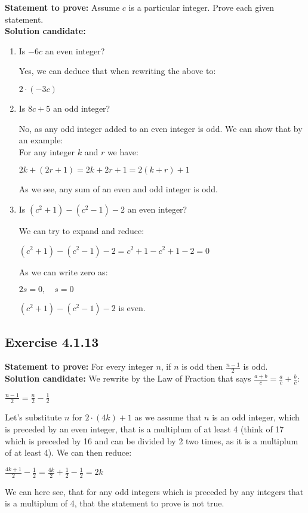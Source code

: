 \documentclass{report}
\newcommand{\cent}[1]{\begin{center}#1\end{center}}
\newcommand{\Prove}{\textbf{Statement to prove: }}
\newcommand{\solution}{\textbf{Solution candidate: }}
\newcommand{\QED}{\boxed{}}
\newcommand{\Exercise}[1]{\subsection{Exercise #1}}
\newcommand{\defaultEnumerateLabel}{\textbf{\alph*.}}
\begin{document}
	\Prove
	Assume $c$ is a particular integer. Prove each given statement.\\
	
	\solution
	\begin{enumerate}[label=\defaultEnumerateLabel]
		\item Is $-6c$ an even integer?
		
		Yes, we can deduce that when rewriting the above to:
		
		$2\cdot (-3c) $
		
		\item Is $8c+5$ an odd integer?
		
		No, as any odd integer added to an even integer is odd. We can show that by an example:\\
		
		For any integer $k$ and $r$ we have:
		\cent{$2k + (2r+1) = 2k + 2r + 1 = 2(k+r) + 1$}
		
		As we see, any sum of an even and odd integer is odd.
		
		\item Is $(c^2 + 1) - (c^2 - 1) - 2$ an even integer?
		
		We can try to expand and reduce:
		
		\cent{$(c^2 + 1) - (c^2 - 1) - 2 = c^2 + 1 - c^2 + 1 - 2 = 0$}
		
		As we can write zero as:
		
		\cent{$2s = 0, \quad s = 0$}
		
		$(c^2 + 1) - (c^2 - 1) - 2$ is even.
	\end{enumerate}
	
	\Exercise{4.1.13}
	\Prove
	For every integer $n$, if $n$ is odd then $\frac{n-1}{2}$ is odd.\\
	
	\solution
	We rewrite by the Law of Fraction that says $\frac{a+b}{c} = \frac{a}{c} + \frac{b}{c}$:
	
	\cent{$\frac{n - 1}{2} = \frac{n}{2} - \frac{1}{2}$}
	
	Let's substitute $n$ for $2\cdot (4k) + 1$ as we assume that $n$ is an odd integer, which is preceded by an even integer, that is a multiplum of at least 4 (think of 17 which is preceded by 16 and can be divided by 2 two times, as it is a multiplum of at least 4). We can then reduce:
	
	\cent{$\frac{4k +1}{2} - \frac{1}{2} = \frac{4k}{2} + \frac{1}{2} - \frac{1}{2} = 2k$}
	
	We can here see, that for any odd integers which is preceded by any integers that is a multiplum of 4, that the statement to prove is not true.\\
	\QED
	
\end{document}
